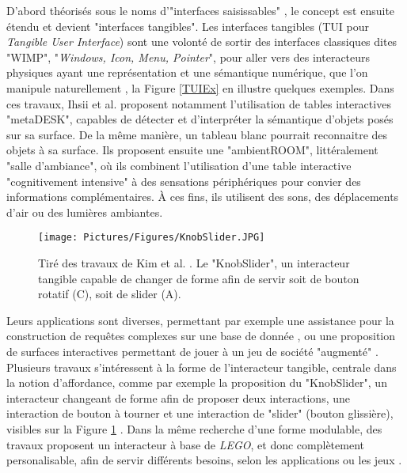 			D'abord théorisés sous le noms d'"interfaces saisissables" \cite{fitzmaurice_bricks_1995}, le concept est ensuite étendu et devient "interfaces tangibles". Les interfaces tangibles (TUI pour \textit{Tangible User Interface}) sont une volonté de sortir des interfaces classiques dites "WIMP", "\textit{Windows, Icon, Menu, Pointer}", pour aller vers des interacteurs physiques ayant une représentation et une sémantique numérique, que l'on manipule naturellement \cite{ishii_tangible_1997}, la Figure \ref{TUIEx} en illustre quelques exemples. Dans ces travaux, Ihsii et al. \cite{ishii_tangible_1997} proposent notamment l'utilisation de tables interactives "metaDESK", capables de détecter et d'interpréter la sémantique d'objets posés sur sa surface. De la même manière, un tableau blanc pourrait reconnaitre des objets à sa surface. Ils proposent ensuite une "ambientROOM", littéralement "salle d'ambiance", où ils combinent l'utilisation d'une table interactive "cognitivement intensive" à des sensations périphériques pour convier des informations complémentaires. À ces fins, ils utilisent des sons, des déplacements d'air ou des lumières ambiantes.
			
			\begin{figure}
			\centering
			\texttt{[image: Pictures/Figures/KnobSlider.JPG]}
			\caption{Tiré des travaux de Kim et al. \cite{kim_knobslider_2019}. Le "KnobSlider", un interacteur tangible capable de changer de forme afin de servir soit de bouton rotatif (C), soit de slider (A).}
			\label{KnobSlider}
		\end{figure}
			
			Leurs applications sont diverses, permettant par exemple une assistance pour la construction de requêtes complexes sur une base de donnée \cite{pereda_tui_2019}, ou une proposition de surfaces interactives permettant de jouer à un jeu de société "augmenté" \cite{villar_project_2018}. Plusieurs travaux s'intéressent à la forme de l'interacteur tangible, centrale dans la notion d'affordance, comme par exemple la proposition du "KnobSlider", un interacteur changeant de forme afin de proposer deux interactions, une interaction de bouton à tourner et une interaction de "slider" (bouton glissière), visibles sur la Figure \ref{KnobSlider} \cite{kim_knobslider_2019}. Dans la même recherche d'une forme modulable, des travaux proposent un interacteur à base de \textit{LEGO}, et donc complètement personalisable, afin de servir différents besoins, selon les applications ou les jeux \cite{arora_virtualbricks_2019}.
				
